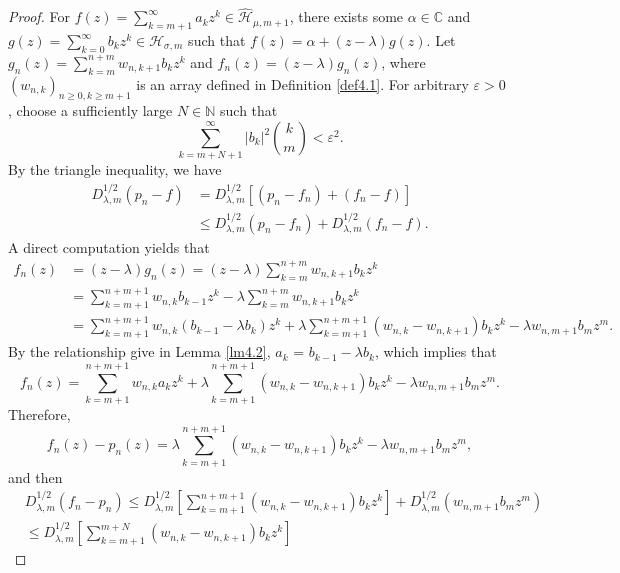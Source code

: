 \documentclass[10pt,a4paper]{amsart}
\begin{document}
\begin{proof}
For \(  f(z)=\sum\limits_{k = m+1}^\infty  {{a_k}{z^k}} \in \widehat{\mathcal{H}}_{\mu, m+1} \), there exists some \( \alpha \in \mathbb{C}\) and \( g(z) = \sum\limits_{k = 0}^\infty  {{b_k}{z^k}} \in {\mathcal{H}_{\sigma ,m}} \) such that \( f(z) = \alpha + (z - \lambda)g(z)\). Let \( {g_n}(z) = \sum\limits_{k = m}^{n + m} {{w_{n,k + 1}}{b_k}{z^k}}\) and \({f_n}(z) = (z - \lambda ){g_n}(z)\), where \( (w_{n,k})_{n \geq 0, k \geq m+1} \) is an array defined in Definition \ref{def4.1}. For arbitrary \( \varepsilon > 0 \) , choose a sufficiently large \( N \in \mathbb{N} \) such that
\[
\sum_{k = m + N +1}^{\infty} |b_k|^2 \binom{k}{m} < \varepsilon^2. \tag{3.7}
\]
By the triangle inequality, we have
\begin{align*}
D_{\lambda ,m}^{1/2}(p_n - f)
&= D_{\lambda ,m}^{1/2}\left[(p_n - f_n) + (f_n - f)\right] \\
&\le D_{\lambda ,m}^{1/2}(p_n - f_n) + D_{\lambda ,m}^{1/2}(f_n - f).
\end{align*}
A direct computation yields that
\begin{align*}
f_n(z)
&= (z - \lambda) g_n(z) = (z - \lambda) \sum_{k = m}^{n + m} w_{n,k + 1} b_k z^k \\
&= \sum_{k = m+1}^{n + m + 1} w_{n,k} b_{k - 1} z^k
- \lambda \sum_{k = m}^{n + m} w_{n,k + 1} b_k z^k \\
&= \sum_{k = m+1}^{n + m + 1} w_{n,k} (b_{k - 1} - \lambda b_k) z^k
+ \lambda \sum_{k = m+1}^{n + m + 1} (w_{n,k} - w_{n,k + 1}) b_k z^k - \lambda {w_{n,m+1}}{b_{m}}{z^{m}}.
\end{align*}
By the relationship give in Lemma \ref{lm4.2}, \( a_k \) = \( b_{k-1} - \lambda b_k \), which implies that
\[
f_n(z) = \sum_{k = m + 1}^{n + m + 1} w_{n,k} a_k z^k
+ \lambda \sum_{k = m + 1}^{n + m + 1} (w_{n,k} - w_{n,k + 1}) b_k z^k - \lambda {w_{n,m+1}}{b_{m}}{z^{m}}.
\]
Therefore,
\[
f_n(z) - p_n(z) = \lambda \sum_{k = m + 1}^{n + m + 1} (w_{n,k} - w_{n,k + 1}) b_k z^k - \lambda {w_{n,m+1}}{b_{m}}{z^{m}},
\]
and then
\begin{align*}
&D_{\lambda ,m}^{1/2}(f_n - p_n)
\le D_{\lambda ,m}^{1/2} \left[ \sum_{k = m + 1}^{n + m + 1} (w_{n,k} - w_{n,k + 1}) b_k z^k \right] + D_{\lambda ,m}^{1/2}({w_{n,m+1}}{b_{m}}{z^{m}})\\
&\le D_{\lambda ,m}^{1/2} \left[ \sum_{k = m + 1}^{m + N} (w_{n,k} - w_{n,k + 1}) b_k z^k \right]

\end{align*}
\end{proof}
\end{document}

